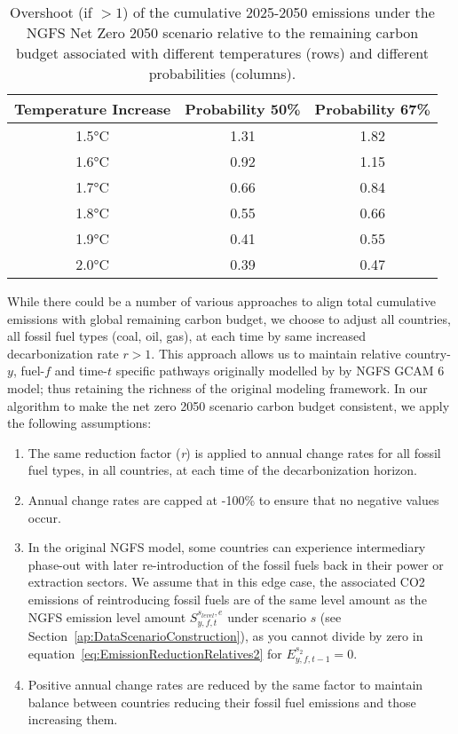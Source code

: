 \documentclass[11pt,a4paper,table,xcdraw]{article}
\begin{document}
\begin{table}[H]
    \centering
    \caption{Overshoot (if $>1$) of the cumulative 2025-2050 emissions under the NGFS Net Zero 2050 scenario relative to the remaining carbon budget associated with different temperatures (rows) and different probabilities (columns).}\label{tab:OvershootNGFS}
    \begin{tabular}{ccc}
        \hline
        Temperature Increase & Probability 50\% & Probability 67\% \\ \hline
        1.5°C & 1.31 & 1.82 \\ 
        1.6°C & 0.92 & 1.15 \\ 
        1.7°C & 0.66 & 0.84 \\ 
        1.8°C & 0.55 & 0.66 \\ 
        1.9°C & 0.41 & 0.55 \\ 
        2.0°C & 0.39 & 0.47 \\ \hline
    \end{tabular}
\end{table}


\noindent While there could be a number of various approaches to align total cumulative emissions with global remaining carbon budget, we choose to adjust all countries, all fossil fuel types (coal, oil, gas), at each time by same increased decarbonization rate $r>1$. This approach allows us to maintain relative country-$y$, fuel-$f$ and time-$t$ specific pathways originally modelled by by NGFS GCAM 6 model; thus retaining the richness of the original modeling framework.\newline
\indent In our algorithm to make the net zero 2050 scenario carbon budget consistent, we apply the following assumptions:

\begin{enumerate}
    \item The same reduction factor (\textit{r}) is applied to annual change rates for all fossil fuel types, in all countries, at each time of the decarbonization horizon.
    \item Annual change rates are capped at -100\% to ensure that no negative values occur. 
    \item In the original NGFS model, some countries can experience intermediary phase-out with later re-introduction of the fossil fuels back in their power or extraction sectors. We assume that in this edge case, the associated CO2 emissions of reintroducing fossil fuels are of the same level amount as the NGFS emission level amount $S^{s_{level},e}_{y,f,t}$ under scenario $s$ (see Section~\ref{ap:DataScenarioConstruction}), as you cannot divide by zero in equation~\ref{eq:EmissionReductionRelatives2} for $E_{y,f,t-1}^{s_2}=0$.
    \item Positive annual change rates are reduced by the same factor to maintain balance between countries reducing their fossil fuel emissions and those increasing them.
\end{enumerate}
\end{document}
